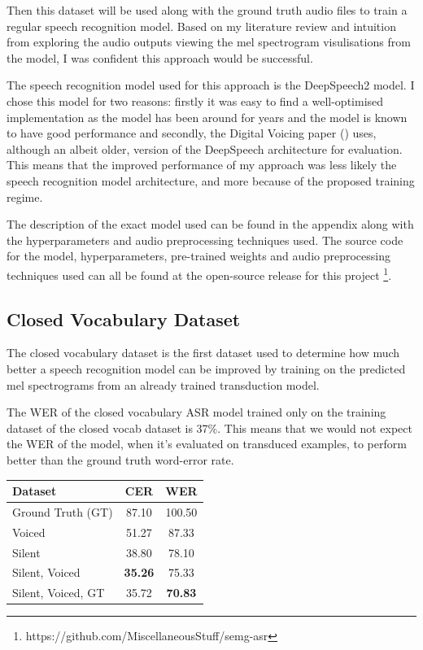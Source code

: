 Then this dataset will be used along with the ground truth audio
files to train a regular speech recognition model. Based on my literature review
and intuition from exploring the audio outputs viewing the mel spectrogram
visulisations from the model, I was confident this approach would be successful.

The speech recognition model used for this approach is the DeepSpeech2 model.
I chose this model for two reasons: firstly it was easy to find a well-optimised
implementation as the model has been around for years and the model is known
to have good performance and secondly, the Digital Voicing paper
(\cite{gaddy2020digital}) uses, although an albeit older, version of the
DeepSpeech architecture for evaluation.
This means that the improved performance of my approach was
less likely the speech recognition model architecture, and more because of the proposed
training regime.

The description of the exact model used can be found in the appendix along with the
hyperparameters and audio preprocessing techniques used. The source code for the
model, hyperparameters, pre-trained weights and audio preprocessing techniques
used can all be found at the open-source release for this project
\footnote{https://github.com/MiscellaneousStuff/semg-asr}.

\subsection{Closed Vocabulary Dataset}

The closed vocabulary dataset is the first dataset used to determine how much better
a speech recognition model can be improved by training on the predicted mel spectrograms
from an already trained transduction model.

The WER of the closed vocabulary ASR model trained only on the training dataset
of the closed vocab dataset is 37\%. This means that we would not expect the WER
of the model, when it's evaluated on transduced examples, to perform better than
the ground truth word-error rate.

{\small\begin{center}
\begin{tabular} {  l  c  c  }
\hline
\textbf{Dataset} & \textbf{CER} & \textbf{WER} \\
\hline
Ground Truth (GT) & 87.10 & 100.50 \\
Voiced & 51.27 & 87.33 \\
Silent & 38.80 & 78.10 \\
Silent, Voiced & \textbf{35.26} & 75.33 \\
\hline
Silent, Voiced, GT & 35.72 & \textbf{70.83} \\
\hline
\end{tabular}
\end{center}}

